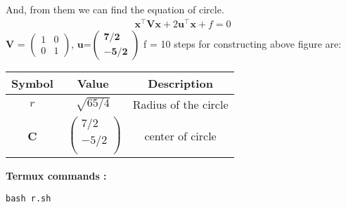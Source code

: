\documentclass[10pt, a4paper]{article}
\let\vec\mathbf
\begin{document}
And, from them we can find the equation of circle.\\
 \begin{align}
\vec{x}^{\top}\vec{V}\vec{x}+2\vec{u}^{\top}\vec{x}+f=0
\end{align}	
$\vec{V}$ = $\begin{pmatrix}
 1 & 0\\
 0 & 1
 \end{pmatrix}$, 
  $\vec{u}$=$\vec{\begin{pmatrix}7/2 \\-5/2 \end{pmatrix}}$
  f = 10
steps for constructing above figure are:  
\begin{center}
\begin{tabular}{|c|c|c|}
	\hline
	\textbf{Symbol}&\textbf{Value}&\textbf{Description}\\
	\hline
	$r$&$\sqrt{65/4}$&Radius of the circle\\
	\hline
	\textbf{C}&$\
	\begin{pmatrix}
		7/2 \\
		-5/2 \\
	\end{pmatrix}$
	&center of circle\\
	\hline
\end{tabular}
\end{center}
\vspace{1mm}
\textbf{Termux commands :}
\begin{lstlisting}
bash r.sh
\end{lstlisting}

\end{document}
